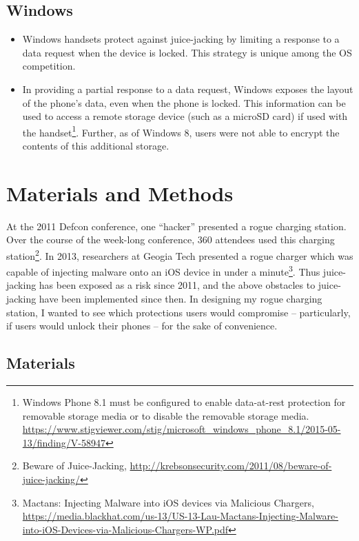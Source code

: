 \documentclass[11pt]{article} %
\begin{document}
\subsection{Windows} 

\begin{itemize}
\item Windows handsets protect against juice-jacking by limiting a response to a data request when the device is locked. This strategy is unique among the OS competition. 

\item In providing a partial response to a data request, Windows exposes the layout of the phone's data, even when the phone is locked. This information can be used to access a remote storage device (such as a microSD card) if used with the handset\footnote{Windows Phone 8.1 must be configured to enable data-at-rest protection for removable storage media or to disable the removable storage media. \url{https://www.stigviewer.com/stig/microsoft_windows_phone_8.1/2015-05-13/finding/V-58947}}. Further, as of Windows 8, users were not able to encrypt the contents of this additional storage. 
\end{itemize} 

\section{Materials and Methods}

At the 2011 Defcon conference, one ``hacker'' presented a rogue charging station. Over the course of the week-long conference, 360 attendees used this charging station\footnote{Beware of Juice-Jacking, \url{http://krebsonsecurity.com/2011/08/beware-of-juice-jacking/}}. In 2013, researchers at Geogia Tech presented a rogue charger which was capable of injecting malware onto an iOS device in under a minute\footnote{Mactans: Injecting Malware into iOS devices via Malicious Chargers, \url{https://media.blackhat.com/us-13/US-13-Lau-Mactans-Injecting-Malware-into-iOS-Devices-via-Malicious-Chargers-WP.pdf}}. Thus juice-jacking has been exposed as a risk since 2011, and the above obstacles to juice-jacking have been implemented since then. In designing my rogue charging station, I wanted to see which protections users would compromise -- particularly, if users would unlock their phones -- for the sake of  convenience.  

\subsection{Materials} 
\end{document}
